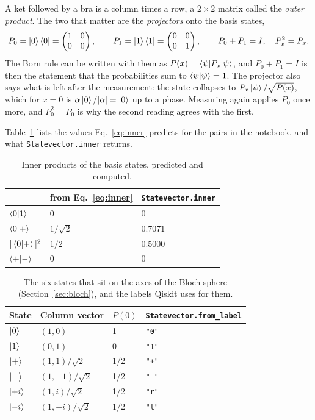 \documentclass[11pt]{article}
\newcommand{\code}[1]{\texttt{#1}}
\begin{document}
A ket followed by a bra is a column times a row, a $2\times2$ matrix called the \emph{outer product}. The two that matter are the \emph{projectors} onto the basis states,
\begin{equation}
P_0 = \ket{0}\bra{0} = \begin{pmatrix}1&0\\0&0\end{pmatrix},\qquad P_1 = \ket{1}\bra{1} = \begin{pmatrix}0&0\\0&1\end{pmatrix},\qquad P_0 + P_1 = I,\quad P_x^2 = P_x .
\label{eq:projectors}
\end{equation}
The Born rule can be written with them as $P(x) = \braket{\psi|P_x|\psi}$, and $P_0 + P_1 = I$ is then the statement that the probabilities sum to $\braket{\psi|\psi} = 1$. The projector also says what is left after the measurement: the state collapses to $P_x\ket{\psi}/\sqrt{P(x)}$, which for $x = 0$ is $\alpha\ket{0}/|\alpha| = \ket{0}$ up to a phase. Measuring again applies $P_0$ once more, and $P_0^2 = P_0$ is why the second reading agrees with the first.

Table~\ref{tab:inner} lists the values Eq.~\eqref{eq:inner} predicts for the pairs in the notebook, and what \code{Statevector.inner} returns.

\begin{table}[h]
\centering
\small
\begin{tabular}{@{}lll@{}}
\toprule
& from Eq.~\eqref{eq:inner} & \code{Statevector.inner} \\
\midrule
$\braket{0|1}$ & $0$ & $0$ \\
$\braket{0|+}$ & $1/\sqrt2$ & $0.7071$ \\
$|\braket{0|+}|^2$ & $1/2$ & $0.5000$ \\
$\braket{+|-}$ & $0$ & $0$ \\
\bottomrule
\end{tabular}
\caption{Inner products of the basis states, predicted and computed.}
\label{tab:inner}
\end{table}

\begin{table}[h]
\centering
\small
\begin{tabular}{@{}llll@{}}
\toprule
State & Column vector & $P(0)$ & \code{Statevector.from\_label} \\
\midrule
$\ket{0}$ & $(1, 0)$ & 1 & \code{"0"} \\
$\ket{1}$ & $(0, 1)$ & 0 & \code{"1"} \\
$\ket{+}$ & $(1, 1)/\sqrt2$ & 1/2 & \code{"+"} \\
$\ket{-}$ & $(1, -1)/\sqrt2$ & 1/2 & \code{"-"} \\
$\ket{{+}i}$ & $(1, i)/\sqrt2$ & 1/2 & \code{"r"} \\
$\ket{{-}i}$ & $(1, -i)/\sqrt2$ & 1/2 & \code{"l"} \\
\bottomrule
\end{tabular}
\caption{The six states that sit on the axes of the Bloch sphere (Section~\ref{sec:bloch}), and the labels Qiskit uses for them.}
\label{tab:states}
\end{table}
\end{document}
